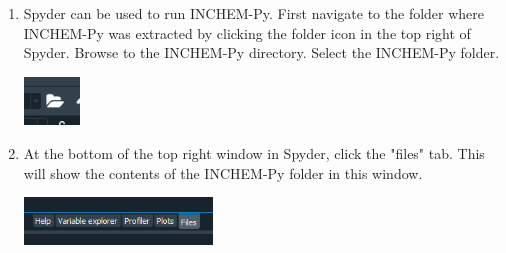 \documentclass[a4paper]{refart}
\begin{document}
{\begin{minipage}{\fullwidth}
\begin{enumerate}
    \item Spyder can be used to run INCHEM-Py. First navigate to the folder where INCHEM-Py was extracted by clicking the folder icon in the top right of Spyder. Browse to the INCHEM-Py directory. Select the INCHEM-Py folder.
                
            \vspace{1em}
            \begin{minipage}[t]{\linewidth}
                \centering
                \includegraphics[width = 1.5cm]{folder.png}
            \end{minipage}
          
    \item At the bottom of the top right window in Spyder, click the "files" tab. This will show the contents of the INCHEM-Py folder in this window.
                
            \vspace{1em}
            \begin{minipage}[t]{\linewidth}
                \centering
                \includegraphics[width = 5cm]{files.png}
            \end{minipage}
          
\end{enumerate}
\end{minipage}}
\end{document}
